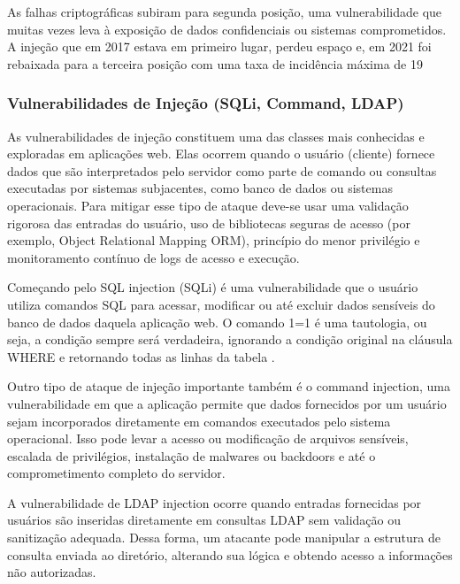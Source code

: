 As falhas criptográficas subiram para segunda posição, uma vulnerabilidade que muitas vezes leva à exposição de dados confidenciais ou sistemas comprometidos. A injeção que em 2017 estava em primeiro lugar, perdeu espaço e, em 2021 foi rebaixada para a terceira posição com uma taxa de incidência máxima de 19%

\subsubsection{
    Vulnerabilidades de Injeção (SQLi, Command, LDAP)
}

As vulnerabilidades de injeção constituem uma das classes mais conhecidas e exploradas em aplicações web. Elas ocorrem quando o usuário (cliente) fornece dados que são interpretados pelo servidor como parte de comando ou consultas executadas por sistemas subjacentes, como banco de dados ou sistemas operacionais. Para mitigar esse tipo de ataque deve-se usar uma validação rigorosa das entradas do usuário, uso de bibliotecas seguras de acesso (por exemplo, Object Relational Mapping \- ORM), princípio do menor privilégio e monitoramento contínuo de logs de acesso e execução. 

Começando pelo SQL injection (SQLi) é uma vulnerabilidade que o usuário utiliza comandos SQL
para acessar, modificar ou até excluir dados sensíveis do banco de dados daquela aplicação web. O comando 1=1 é uma tautologia, ou seja, a condição sempre será verdadeira, ignorando a condição original na cláusula WHERE e retornando todas as linhas da tabela \cite{appelt:2014}. 

Outro tipo de ataque de injeção importante também é o command injection, uma vulnerabilidade em que a aplicação permite que dados fornecidos por um usuário sejam incorporados diretamente em comandos executados pelo sistema operacional. Isso pode levar a acesso ou modificação de arquivos sensíveis, escalada de privilégios, instalação de malwares ou backdoors e até o comprometimento completo do servidor. 

A vulnerabilidade de LDAP injection ocorre quando entradas fornecidas por usuários são inseridas diretamente em consultas LDAP sem validação ou sanitização adequada. Dessa forma, um atacante pode manipular a estrutura de consulta enviada ao diretório, alterando sua lógica e obtendo acesso a informações não autorizadas.  

